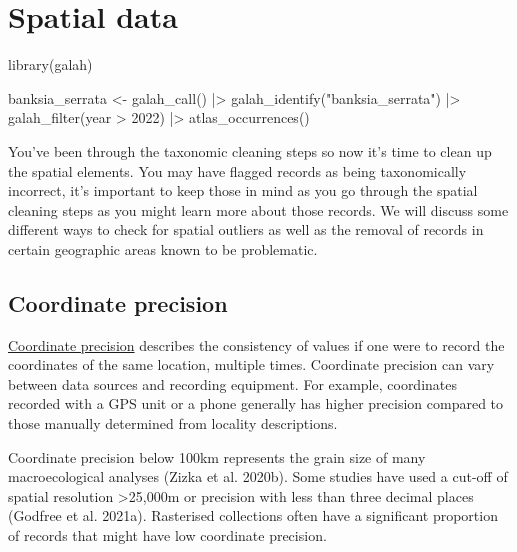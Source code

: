 \documentclass[
  letterpaper,
  DIV=11,
  numbers=noendperiod,
  oneside]{scrreprt}
\newenvironment{Shaded}{\begin{snugshade}}{\end{snugshade}}
\newcommand{\DecValTok}[1]{\textcolor[rgb]{0.68,0.00,0.00}{#1}}
\newcommand{\FunctionTok}[1]{\textcolor[rgb]{0.28,0.35,0.67}{#1}}
\newcommand{\NormalTok}[1]{\textcolor[rgb]{0.00,0.23,0.31}{#1}}
\newcommand{\OtherTok}[1]{\textcolor[rgb]{0.00,0.23,0.31}{#1}}
\newcommand{\SpecialCharTok}[1]{\textcolor[rgb]{0.37,0.37,0.37}{#1}}
\newcommand{\StringTok}[1]{\textcolor[rgb]{0.13,0.47,0.30}{#1}}
\begin{document}

\hypertarget{sec-spatial}{%
\chapter{Spatial data}\label{sec-spatial}}

\begin{Shaded}
\begin{Highlighting}[]
\FunctionTok{library}\NormalTok{(galah)}

\NormalTok{banksia\_serrata }\OtherTok{\textless{}{-}} \FunctionTok{galah\_call}\NormalTok{() }\SpecialCharTok{|\textgreater{}} 
  \FunctionTok{galah\_identify}\NormalTok{(}\StringTok{"banksia\_serrata"}\NormalTok{) }\SpecialCharTok{|\textgreater{}} 
  \FunctionTok{galah\_filter}\NormalTok{(year }\SpecialCharTok{\textgreater{}} \DecValTok{2022}\NormalTok{) }\SpecialCharTok{|\textgreater{}}  
  \FunctionTok{atlas\_occurrences}\NormalTok{()}
\end{Highlighting}
\end{Shaded}

You've been through the taxonomic cleaning steps so now it's time to
clean up the spatial elements. You may have flagged records as being
taxonomically incorrect, it's important to keep those in mind as you go
through the spatial cleaning steps as you might learn more about those
records. We will discuss some different ways to check for spatial
outliers as well as the removal of records in certain geographic areas
known to be problematic.

\hypertarget{coordinate-precision}{%
\section{Coordinate precision}\label{coordinate-precision}}

\href{https://dwc.tdwg.org/terms/\#dwc:coordinatePrecision}{Coordinate
precision} describes the consistency of values if one were to record the
coordinates of the same location, multiple times. Coordinate precision
can vary between data sources and recording equipment. For example,
coordinates recorded with a GPS unit or a phone generally has higher
precision compared to those manually determined from locality
descriptions.

Coordinate precision below 100km represents the grain size of many
macroecological analyses (Zizka et al. 2020b). Some studies have used a
cut-off of spatial resolution \textgreater25,000m or precision with less
than three decimal places (Godfree et al. 2021a). Rasterised collections
often have a significant proportion of records that might have low
coordinate precision.
\end{document}
